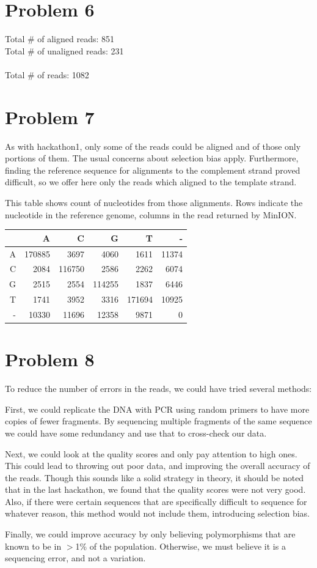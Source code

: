 \documentclass[11pt]{article}
\begin{document}
\section*{Problem 6}
Total \# of aligned reads: 851\\
Total \# of unaligned reads: 231\\
\\
Total \# of reads: 1082\\
\section*{Problem 7}
As with hackathon1, only some of the reads could be aligned and of those only portions of them.  The usual concerns about selection bias apply.  Furthermore, finding the reference sequence for alignments to the complement strand proved difficult, so we offer here only the reads which aligned to the template strand.

This table shows count of nucleotides from those alignments.  Rows indicate the nucleotide in the reference genome, columns in the read returned by MinION.


\begin{tabular}{r||r|r|r|r|r}
  & A & C & G & T & -\\ \hline
\hline
A & 170885 & 3697 & 4060 & 1611 & 11374\\ 
\hline
C & 2084 & 116750 & 2586 & 2262 & 6074\\ 
\hline
G & 2515 & 2554 & 114255 & 1837 & 6446\\ 
\hline
T & 1741 & 3952 & 3316 & 171694 & 10925\\ 
\hline
- & 10330 & 11696 & 12358 & 9871 & 0\\ 
\end{tabular}
\section*{Problem 8}
To reduce the number of errors in the reads, we could have tried several methods:

First, we could replicate the DNA with PCR using random primers to have more copies of
fewer fragments. By sequencing multiple fragments of the same sequence we could have some redundancy and 
use that to cross-check our data.

Next, we could look at the quality scores and only pay attention to high ones.
This could lead to throwing out poor data, and improving the overall accuracy
of the reads. Though this sounds like a solid strategy in theory, it should be
noted that in the last hackathon, we found that the quality scores were not
very good. Also, if there were certain sequences that are specifically difficult to sequence
for whatever reason, this method would not include them, introducing selection bias.

Finally, we could improve accuracy by only believing polymorphisms that are known 
to be in $>$1\% of the population. Otherwise, we must believe it is a sequencing error, and
not a variation. 
\end{document}
